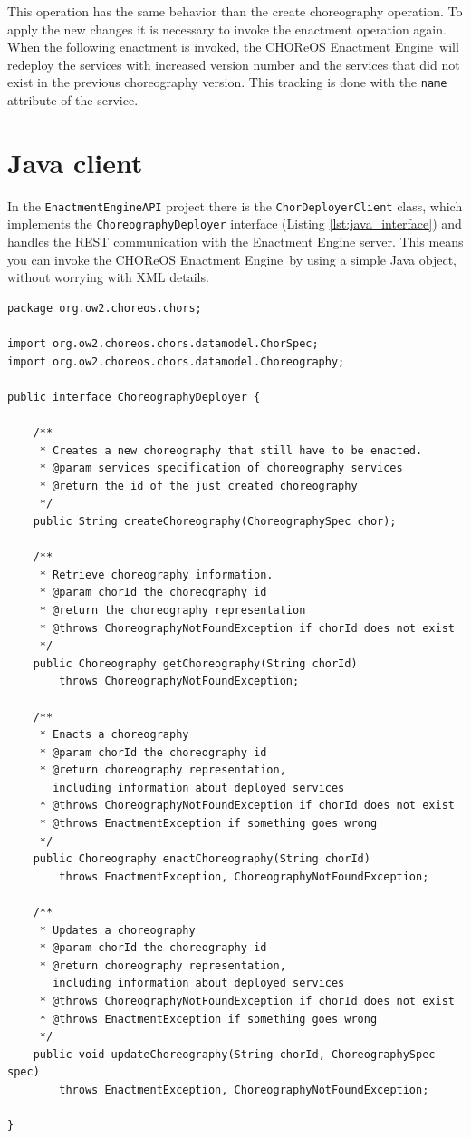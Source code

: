 \documentclass[a4paper, 10pt]{article}
\newcommand{\ee}{CHOReOS Enactment Engine}
\begin{document}
This operation has the same behavior than the create choreography operation.
To apply the new changes it is necessary to invoke the enactment operation again.
When the following enactment is invoked, the \ee\ will redeploy the services with increased version number and the services that did not exist in the previous choreography version. This tracking is done with the \texttt{name} attribute of the service.

\section{Java client}
\label{sec:client}

In the \verb!EnactmentEngineAPI! project there is the \verb!ChorDeployerClient! class, which implements the \verb!ChoreographyDeployer! interface (Listing \ref{lst:java_interface}) and handles the REST communication with the Enactment Engine server. This means you can invoke the \ee\ by using a simple Java object, without worrying with XML details.

{\small
\lstset{language=Java}
\begin{lstlisting}[caption=\ee\ Java interface, label=lst:java_interface]
package org.ow2.choreos.chors;

import org.ow2.choreos.chors.datamodel.ChorSpec;
import org.ow2.choreos.chors.datamodel.Choreography;

public interface ChoreographyDeployer {
	
	/**
	 * Creates a new choreography that still have to be enacted.
	 * @param services specification of choreography services
	 * @return the id of the just created choreography
	 */
	public String createChoreography(ChoreographySpec chor);
	
	/**
	 * Retrieve choreography information.
	 * @param chorId the choreography id
	 * @return the choreography representation
	 * @throws ChoreographyNotFoundException if chorId does not exist 
	 */
	public Choreography getChoreography(String chorId) 
		throws ChoreographyNotFoundException;

	/**
	 * Enacts a choreography
	 * @param chorId the choreography id
	 * @return choreography representation, 
	   including information about deployed services 
	 * @throws ChoreographyNotFoundException if chorId does not exist 
	 * @throws EnactmentException if something goes wrong 
	 */
	public Choreography enactChoreography(String chorId) 
		throws EnactmentException, ChoreographyNotFoundException;

	/**
	 * Updates a choreography
	 * @param chorId the choreography id
	 * @return choreography representation, 
	   including information about deployed services 
	 * @throws ChoreographyNotFoundException if chorId does not exist 
	 * @throws EnactmentException if something goes wrong
	 */
	public void updateChoreography(String chorId, ChoreographySpec spec) 
		throws EnactmentException, ChoreographyNotFoundException;
	
}
\end{lstlisting}
}
\end{document}
